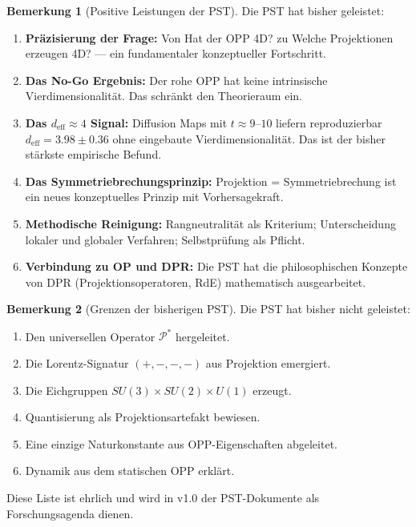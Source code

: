 \documentclass[11pt,a4paper]{article}
\theoremstyle{plain}
\theoremstyle{definition}
\newtheorem{remark}{Bemerkung}[section]
\newcommand{\deff}{d_{\mathrm{eff}}}
\newcommand{\Proj}{\mathcal{P}}
\begin{document}
\begin{remark}[Positive Leistungen der PST]
Die PST hat bisher geleistet:
\begin{enumerate}
  \item \textbf{Pr\"{a}zisierung der Frage:} Von \glqq{}Hat der OPP 4D?\grqq{}
        zu \glqq{}Welche Projektionen erzeugen 4D?\grqq{} --- ein
        fundamentaler konzeptueller Fortschritt.
  \item \textbf{Das No-Go Ergebnis:} Der rohe OPP hat keine intrinsische
        Vierdimensionalit\"{a}t. Das schr\"{a}nkt den Theorieraum ein.
  \item \textbf{Das $\deff \approx 4$ Signal:} Diffusion Maps mit
        $t \approx 9$--$10$ liefern reproduzierbar $\deff = 3.98 \pm 0.36$
        ohne eingebaute Vierdimensionalit\"{a}t. Das ist der bisher
        st\"{a}rkste empirische Befund.
  \item \textbf{Das Symmetriebrechungsprinzip:} Projektion = Symmetriebrechung
        ist ein neues konzeptuelles Prinzip mit Vorhersagekraft.
  \item \textbf{Methodische Reinigung:} Rangneutralit\"{a}t als Kriterium;
        Unterscheidung lokaler und globaler Verfahren; Selbstpr\"{u}fung
        als Pflicht.
  \item \textbf{Verbindung zu OP und DPR:} Die PST hat die philosophischen
        Konzepte von DPR (Projektionsoperatoren, RdE) mathematisch
        ausgearbeitet.
\end{enumerate}
\end{remark}

\begin{remark}[Grenzen der bisherigen PST]
Die PST hat bisher nicht geleistet:
\begin{enumerate}
  \item Den universellen Operator $\Proj^\ast$ hergeleitet.
  \item Die Lorentz-Signatur $(+,-,-,-)$ aus Projektion emergiert.
  \item Die Eichgruppen $SU(3) \times SU(2) \times U(1)$ erzeugt.
  \item Quantisierung als Projektionsartefakt bewiesen.
  \item Eine einzige Naturkonstante aus OPP-Eigenschaften abgeleitet.
  \item Dynamik aus dem statischen OPP erkl\"{a}rt.
\end{enumerate}
Diese Liste ist ehrlich und wird in v1.0 der PST-Dokumente
als Forschungsagenda dienen.
\end{remark}
\end{document}
